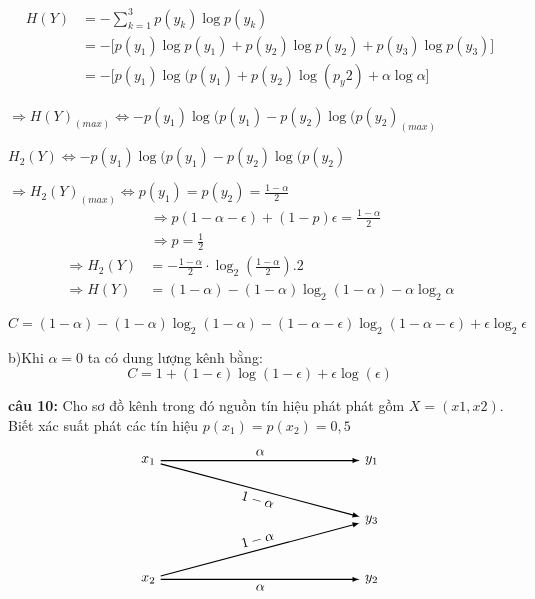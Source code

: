 \documentclass[12pt]{article}
\begin{document}
\[
\begin{aligned}
H(Y) &= -\sum_{k=1}^{3} p(y_k) \log p(y_k) \\
     &= - \Big[ 
         p(y_1) \log p(y_1)
       + p(y_2) \log p(y_2)
       + p(y_3) \log p(y_3)
     \Big] \\
     &= - \Big[
      p(y_1)\log(p(y_1)+p(y_2)\log(p_y2)+  
      \alpha \log \alpha
     \Big]
\end{aligned}
\]

$\Rightarrow H(Y)_(max) \Leftrightarrow -p(y_1)\log(p(y_1)-p(y_2)\log(p(y_2)_(max)$

$H_2(Y) \Leftrightarrow -p(y_1)\log(p(y_1)-p(y_2)\log(p(y_2)$

$\Rightarrow H_2(Y)_(max) \Leftrightarrow p(y_1)=p(y_2)=\frac{1-\alpha}{2} $
\[
\begin{aligned}
&\Rightarrow p(1 - \alpha - \epsilon) + (1 - p)\epsilon = \frac{1 - \alpha}{2} \\
&\Rightarrow p=\frac{1}{2}
\end{aligned}
\]
\[
\begin{aligned}
\Rightarrow H_2(Y) &= -\frac{1 - \alpha}{2} \cdot \log_2\left(\frac{1 - \alpha}{2}\right).2 \\
\Rightarrow H(Y) &= (1 - \alpha) - (1 - \alpha) \log_2(1 - \alpha) - \alpha \log_2 \alpha
\end{aligned}
\]


\[
C = (1 - \alpha) - (1 - \alpha) \log_2(1 - \alpha) - (1 - \alpha - \epsilon) \log_2(1 - \alpha - \epsilon) + \epsilon \log_2 \epsilon
\]


b)Khi $\alpha=0$ ta có dung lượng kênh bằng:
\[
C=1+(1-\epsilon)\log(1-\epsilon)+\epsilon\log(\epsilon)
\]





\newpage
\textbf{câu 10: }Cho sơ đồ kênh trong đó nguồn tín hiệu phát phát gồm $X=(x1,x2)$. Biết xác suất phát các tín hiệu $p(x_1)=p(x_2)=0,5$
\[
\begin{tikzpicture}[>=latex, thick]

\node[left] (x1) at (0,3) {$x_1$};
\node[left] (x2) at (0,0) {$x_2$};

\node[right] (y1) at (5,3) {$y_1$};
\node[right] (y3) at (5,1.5) {$y_3$};
\node[right] (y2) at (5,0) {$y_2$};

\draw[->] (x1) -- (y1) node[midway, above] {$\alpha$};
\draw[->] (x1) -- (y3) node[midway, sloped, below] {$1 - \alpha$};

\draw[->] (x2) -- (y2) node[midway, below] {$\alpha$};
\draw[->] (x2) -- (y3) node[midway, sloped, above] {$1 - \alpha$};

\end{tikzpicture}
\]
\end{document}
